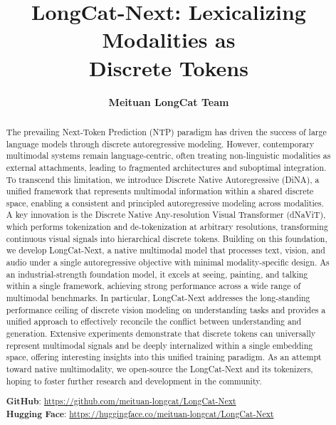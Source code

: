 \documentclass{article}
\title{LongCat-Next: Lexicalizing Modalities as \\ Discrete Tokens}
\author{
\textbf{Meituan LongCat Team}
}
\begin{document}
\maketitle



\begin{abstract}

The prevailing Next-Token Prediction (NTP) paradigm has driven the success of large language models through discrete autoregressive modeling. However, contemporary multimodal systems remain language-centric, often treating non-linguistic modalities as external attachments, leading to fragmented architectures and suboptimal integration.
To transcend this limitation, we introduce Discrete Native Autoregressive (DiNA), a unified framework that represents multimodal information within a shared discrete space, enabling a consistent and principled autoregressive modeling across modalities.
A key innovation is the Discrete Native Any-resolution Visual Transformer (dNaViT), which performs tokenization and de-tokenization at arbitrary resolutions, transforming continuous visual signals into hierarchical discrete tokens. Building on this foundation, we develop LongCat-Next, a native multimodal model that processes text, vision, and audio under a single autoregressive objective with minimal modality-specific design.
As an industrial-strength foundation model, it excels at seeing, painting, and talking within a single framework, achieving strong performance across a wide range of multimodal benchmarks. 
In particular, LongCat-Next addresses the long-standing performance ceiling of discrete vision modeling on understanding tasks and provides a unified approach to effectively reconcile the conflict between understanding and generation.
Extensive experiments demonstrate that discrete tokens can universally represent multimodal signals and be deeply internalized within a single embedding space, offering interesting insights into this unified training paradigm.
As an attempt toward native multimodality, we open-source the LongCat-Next and its tokenizers, hoping to foster further research and development in the community.

\textbf{GitHub}: \href{https://github.com/meituan-longcat/LongCat-Next}{https://github.com/meituan-longcat/LongCat-Next}\\
\textbf{Hugging Face}: \href{https://huggingface.co/meituan-longcat/LongCat-Next}{https://huggingface.co/meituan-longcat/LongCat-Next}\\


\end{abstract}
\end{document}
